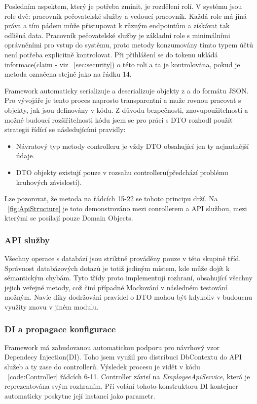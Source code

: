 \documentclass[
  biblatex,
  glossaries,
  index
]{kidiplom}
\begin{document}
Posledním aspektem, který je potřeba zmínit, je rozdělení rolí. V systému jsou role dvě: pracovník pečovatelské služby a vedoucí pracovník. Každá role má jiná práva a tím pádem může přistupovat k různým endpointům a získávat tak odlišná data. Pracovník pečovatelské služby je základní role s minimálními oprávněními pro vstup do systému, proto metody konzumovány tímto typem účtů není potřeba explicitně kontrolovat. Při přihlášení se do tokenu ukládá informace(claim - viz ~\ref{sec:security}) o této roli a ta je kontrolována, pokud je metoda označena stejně jako na řádku 14.

Framework automaticky serializuje a deserializuje objekty z a do formátu JSON. Pro vývojáře je tento proces naprosto transparentní a muže rovnou pracovat s objekty, jak jsou definovány v kódu. Z důvodu bezpečnosti, znovupoužitelnosti a možné budoucí rozšiřitelnosti kódu jsem se pro práci s DTO rozhodl použít strategii řídící se následujícími pravidly: 
\begin{itemize}
	\item Návratový typ metody controlleru je vždy DTO obsahující jen ty nejnutnější údaje.
	\item DTO objekty existují pouze v rozsahu controlleru(předchází problému kruhových závislostí).
\end{itemize} 
Lze pozorovat, že metoda na řádcích 15-22 se tohoto principu drží. Na ~\ref{fig:ApiStructure} je toto demonstrováno mezi conrollerem a API službou, mezi kterými se posílají pouze Domain Objects.

\subsubsection{API služby}
Všechny operace s databází jsou striktně prováděny pouze v této skupině tříd. Správnost databázových dotazů je totiž jediným místem, kde může dojít k sémantickým chybám. Tyto třídy proto implementují rozhraní, obsahující všechny jejich veřejné metody, což činí případné Mockování v následném testování možným. Navíc díky dodržováni pravidel o DTO mohou být kdykoliv v budoucnu využity znovu v jiném modulu. 

\subsubsection{DI a propagace konfigurace}
Framework má zabudovanou automatickou podporu pro návrhový vzor Dependecy Injection(DI). Toho jsem využil pro distribuci DbContextu do API služeb a ty zase do controllerů. Výsledek procesu je vidět v kódu ~\ref{code:Controller} řádcích 6-11. Controller závisí na \textit{EmployeeApiService}, která je reprezentována svým rozhraním.  Při volání tohoto konstruktoru DI kontejner automaticky poskytne její instanci jako parametr.
\end{document}

